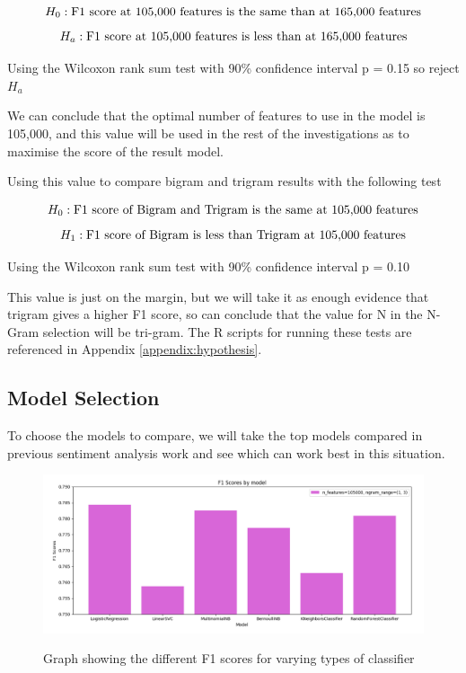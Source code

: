 $$H_0: \textnormal{F1 score at 105,000 features is the same than at 165,000 features} $$
$$H_a: \textnormal{F1 score at 105,000 features is less than at 165,000 features}$$

Using the Wilcoxon rank sum test with 90\% confidence interval 
p = 0.15 so reject $H_a$


We can conclude that the optimal number of features to use in the model is 105,000, and this value will be used in the rest of the investigations as to maximise the score of the result model.



Using this value to compare bigram and trigram results with the following test 

$$ H_0: \textnormal{F1 score of Bigram and Trigram is the same at 105,000 features} $$
$$ H_1: \textnormal{F1 score of Bigram is less than Trigram at 105,000 features} $$

Using the Wilcoxon rank sum test with 90\% confidence interval 
p = 0.10

This value is just on the margin, but we will take it as enough evidence that trigram gives a higher F1 score, so can conclude that the value for N in the N-Gram selection will be tri-gram. The R scripts for running these tests are referenced in Appendix
\ref{appendix:hypothesis}.

\pagebreak

\subsection{Model Selection}

To choose the models to compare, we will take the top models compared in previous sentiment analysis work \cite{towardsDS} and see which can work best in this situation.

\begin{figure}[h]
\caption{Graph showing the different F1 scores for varying types of classifier}
\centering
\includegraphics[scale=0.5]{graphs/models.png}
\label{model:graph}
\end{figure}


